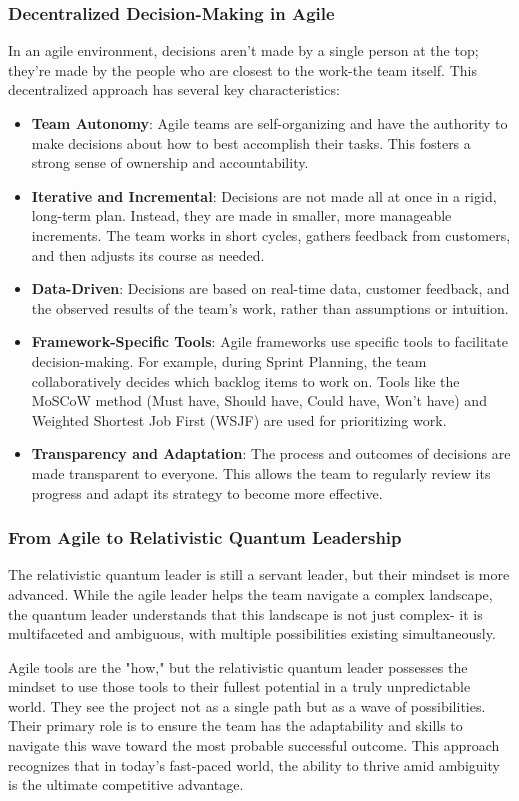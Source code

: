 \documentclass{article}
\begin{document}
\subsubsection*{Decentralized Decision-Making in Agile}
In an agile environment, decisions aren't made by a single person at the top; they're made by the people who are closest to the work-the team itself. This decentralized approach has several key characteristics:
\begin{itemize}
\item \textbf{Team Autonomy}: Agile teams are self-organizing and have the authority to make decisions about how to best accomplish their tasks. This fosters a strong sense of ownership and accountability.
\item \textbf{Iterative and Incremental}: Decisions are not made all at once in a rigid, long-term plan. Instead, they are made in smaller, more manageable increments. The team works in short cycles, gathers feedback from customers, and then adjusts its course as needed.
\item \textbf{Data-Driven}: Decisions are based on real-time data, customer feedback, and the observed results of the team's work, rather than assumptions or intuition.
\item \textbf{Framework-Specific Tools}: Agile frameworks use specific tools to facilitate decision-making. For example, during Sprint Planning, the team collaboratively decides which backlog items to work on. Tools like the MoSCoW method (Must have, Should have, Could have, Won't have) and Weighted Shortest Job First (WSJF) are used for prioritizing work.
\item \textbf{Transparency and Adaptation}: The process and outcomes of decisions are made transparent to everyone. This allows the team to regularly review its progress and adapt its strategy to become more effective.
\end{itemize}

\subsubsection*{From Agile to Relativistic Quantum Leadership}
The relativistic quantum leader is still a servant leader, but their mindset is more advanced. While the agile leader helps the team navigate a complex landscape, the quantum leader understands that this landscape is not just complex- it is multifaceted and ambiguous, with multiple possibilities existing simultaneously.

Agile tools are the "how," but the relativistic quantum leader possesses the mindset to use those tools to their fullest potential in a truly unpredictable world. They see the project not as a single path but as a wave of possibilities. Their primary role is to ensure the team has the adaptability and skills to navigate this wave toward the most probable successful outcome. This approach recognizes that in today's fast-paced world, the ability to thrive amid ambiguity is the ultimate competitive advantage.
\end{document}
